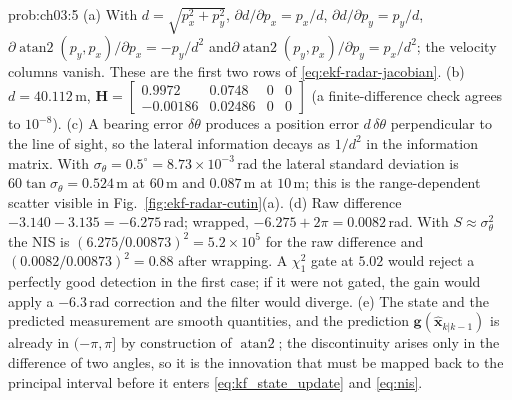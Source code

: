 \begin{sol}{prob:ch03:5}
(a) With $d=\sqrt{p_x^{2}+p_y^{2}}$, $\partial d/\partial p_x=p_x/d$, $\partial d/\partial p_y=p_y/d$, $\partial\operatorname{atan2}(p_y,p_x)/\partial p_x=-p_y/d^{2}$ and\allowbreak $\partial\operatorname{atan2}(p_y,p_x)/\partial p_y=p_x/d^{2}$; the velocity columns vanish. These are the first two rows of \eqref{eq:ekf-radar-jacobian}.
(b) $d=40.112$\,m, $\mathbf{H}=\begin{bmatrix}0.9972&0.0748&0&0\\-0.00186&0.02486&0&0\end{bmatrix}$ (a finite-difference check agrees to $10^{-8}$).
(c) A bearing error $\delta\theta$ produces a position error $d\,\delta\theta$ perpendicular to the line of sight, so the lateral information decays as $1/d^{2}$ in the information matrix. With $\sigma_\theta=0.5^{\circ}=8.73\times10^{-3}$\,rad the lateral standard deviation is $60\tan\sigma_\theta=0.524$\,m at $60$\,m and $0.087$\,m at $10$\,m; this is the range-dependent scatter visible in Fig.~\ref{fig:ekf-radar-cutin}(a).
(d) Raw difference $-3.140-3.135=-6.275$\,rad; wrapped, $-6.275+2\pi=0.0082$\,rad. With $S\approx\sigma_\theta^{2}$ the NIS is $(6.275/0.00873)^{2}=5.2\times10^{5}$ for the raw difference and $(0.0082/0.00873)^{2}=0.88$ after wrapping. A $\chi^{2}_{1}$ gate at $5.02$ would reject a perfectly good detection in the first case; if it were not gated, the gain would apply a $-6.3$\,rad correction and the filter would diverge.
(e) The state and the predicted measurement are smooth quantities, and the prediction $\mathbf{g}(\widehat{\mathbf{x}}_{k|k-1})$ is already in $(-\pi,\pi]$ by construction of $\operatorname{atan2}$; the discontinuity arises only in the difference of two angles, so it is the innovation that must be mapped back to the principal interval before it enters \eqref{eq:kf_state_update} and \eqref{eq:nis}.
\end{sol}

